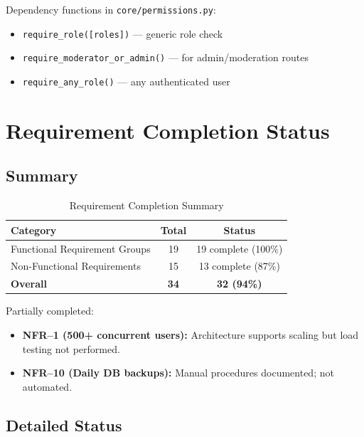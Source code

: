\documentclass[10pt,a4paper]{report}
\begin{document}
Dependency functions in \texttt{core/permissions.py}:
\begin{itemize}
    \item \texttt{require\_role([roles])} --- generic role check
    \item \texttt{require\_moderator\_or\_admin()} --- for admin/moderation routes
    \item \texttt{require\_any\_role()} --- any authenticated user
\end{itemize}

\chapter{Requirement Completion Status}

\section{Summary}

\begin{table}[h]
    \centering
    \begin{tabular}{|l|c|c|}
        \hline
        \textbf{Category}               & \textbf{Total} & \textbf{Status}       \\
        \hline
        Functional Requirement Groups   & 19             & 19 complete (100\%)   \\
        \hline
        Non-Functional Requirements     & 15             & 13 complete (87\%)    \\
        \hline
        \textbf{Overall}                & \textbf{34}    & \textbf{32 (94\%)}    \\
        \hline
    \end{tabular}
    \caption{Requirement Completion Summary}
\end{table}

Partially completed:
\begin{itemize}
    \item \textbf{NFR--1 (500+ concurrent users):} Architecture supports scaling but load testing not performed.
    \item \textbf{NFR--10 (Daily DB backups):} Manual procedures documented; not automated.
\end{itemize}

\section{Detailed Status}
\end{document}
